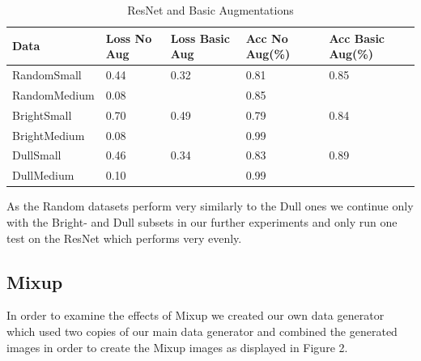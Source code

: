 \documentclass{article}
\begin{document}
\begin{table}[H]
	\caption{ResNet and Basic Augmentations}
	\label{sample-table}
	\centering
	\begin{tabular}{lllll}
		\toprule
		Data & Loss No Aug & Loss Basic Aug & Acc No Aug(\%)& Acc Basic Aug(\%) \\
		\midrule
		RandomSmall  & 0.44 & 0.32& 0.81 & 0.85 \\
		RandomMedium & 0.08 &     & 0.85 &      \\
		BrightSmall  & 0.70 & 0.49& 0.79 & 0.84 \\
		BrightMedium & 0.08 &     & 0.99 &      \\
		DullSmall    & 0.46 & 0.34& 0.83 & 0.89 \\
		DullMedium   & 0.10 &     & 0.99 &      \\
		\bottomrule
	\end{tabular}
\end{table}




As the Random datasets perform very similarly to the Dull ones we continue only with the Bright- and Dull subsets in our further experiments and only run one test on the ResNet which performs very evenly. 

\subsection{Mixup}

In order to examine the effects of Mixup we created our own data generator which used two copies of our main data generator and combined the generated images in order to create the Mixup images as displayed in Figure 2.
\end{document}
